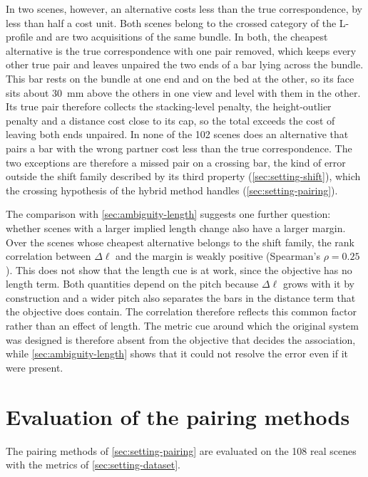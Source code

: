 \documentclass[a4paper, 12pt, twoside]{book}
\begin{document}
In two scenes, however, an alternative costs less than the true correspondence, by less than half a cost unit. Both scenes belong to the crossed category of the L-profile and are two acquisitions of the same bundle. In both, the cheapest alternative is the true correspondence with one pair removed, which keeps every other true pair and leaves unpaired the two ends of a bar lying across the bundle. This bar rests on the bundle at one end and on the bed at the other, so its face sits about 30~mm above the others in one view and level with them in the other. Its true pair therefore collects the stacking-level penalty, the height-outlier penalty and a distance cost close to its cap, so the total exceeds the cost of leaving both ends unpaired. In none of the 102 scenes does an alternative that pairs a bar with the wrong partner cost less than the true correspondence. The two exceptions are therefore a missed pair on a crossing bar, the kind of error outside the shift family described by its third property (\cref{sec:setting-shift}), which the crossing hypothesis of the hybrid method handles (\cref{sec:setting-pairing}).

The comparison with \cref{sec:ambiguity-length} suggests one further question: whether scenes with a larger implied length change also have a larger margin. Over the scenes whose cheapest alternative belongs to the shift family, the rank correlation between $\Delta\ell$ and the margin is weakly positive (Spearman's $\rho = 0.25$). This does not show that the length cue is at work, since the objective has no length term. Both quantities depend on the pitch because $\Delta\ell$ grows with it by construction and a wider pitch also separates the bars in the distance term that the objective does contain. The correlation therefore reflects this common factor rather than an effect of length. The metric cue around which the original system was designed is therefore absent from the objective that decides the association, while \cref{sec:ambiguity-length} shows that it could not resolve the error even if it were present.

\chapter{Evaluation of the pairing methods}
\label{ch:evaluation}

The pairing methods of \cref{sec:setting-pairing} are evaluated on the 108 real scenes with the metrics of \cref{sec:setting-dataset}.
\end{document}
